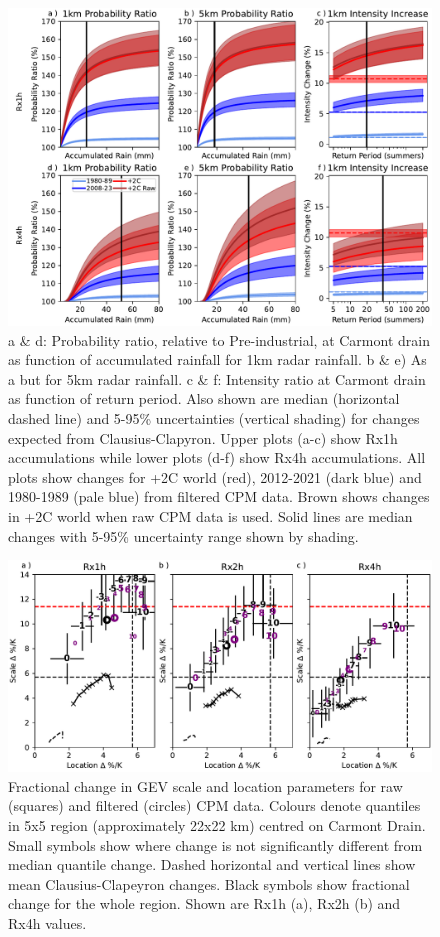 \documentclass[11pt,a4paper]{article}
\begin{document}
\clearpage
\begin{figure}[ht!]
	\centering
	\includegraphics[width=0.9\linewidth]{intens_prob_ratios}
	\caption{a \& d: Probability ratio, relative to Pre-industrial, at Carmont drain as function of accumulated rainfall for 1km radar rainfall. b \& e) As a but for 5km radar rainfall. c \& f: Intensity ratio at Carmont drain  as function of  return period. Also shown are median (horizontal dashed line) and 5-95\% uncertainties (vertical shading) for changes expected from Clausius-Clapyron. Upper plots (a-c) show Rx1h accumulations while lower plots (d-f) show Rx4h accumulations. All plots show changes for +2C world (red), 2012-2021 (dark blue) and 1980-1989 (pale blue) from filtered CPM data. Brown shows changes in +2C world when raw CPM data is used.   Solid lines are median changes with 5-95\% uncertainty range shown by  shading.}
	\label{fig:int_pr}
\end{figure}
\clearpage
\begin{figure}[ht!]
	\centering
	\includegraphics[width=\linewidth]{carmont_gev_quant_change}
	\caption{
		Fractional change in GEV scale  and location parameters for raw (squares) and filtered (circles) CPM data. 
				Colours denote quantiles in 5x5 region (approximately 22x22 km) centred on Carmont Drain. 
				Small symbols show where change is not significantly different from median quantile change.
				Dashed horizontal and vertical lines show mean Clausius-Clapeyron changes.
				Black symbols show fractional change for the whole region.  
				Shown are Rx1h (a), Rx2h (b) and Rx4h values.
	}
	\label{fig:carmont_gev_quant_change}
\end{figure}
\end{document}
